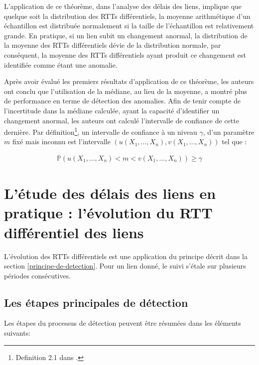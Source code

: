 L'application de ce théorème, dans  l'analyse des délais des liens, implique que quelque soit la distribution des RTTs différentiels, la moyenne arithmétique d'un échantillon  est distribuée normalement si la taille de l'échantillon est relativement grande. En pratique,
si un lien subit un changement anormal, la distribution de la moyenne des RTTs différentiels dévie de la distribution normale, par conséquent, la moyenne des RTTs différentiels ayant produit ce changement est identifiée comme  étant une anomalie.

Après avoir évalué les premiers résultats d'application de ce théorème, les auteurs ont conclu que l'utilisation de la médiane,  au lieu de la moyenne, a montré plus de performance en terme de détection des anomalies.
Afin de tenir compte de l'incertitude dans la médiane calculée, ayant la capacité d'identifier un changement anormal, les auteurs ont  calculé  l'intervalle de confiance de cette dernière.
Par définition\footnote{Definition 2.1 dans \cite{leboudec2010performance}.},  un intervalle de confiance à un niveau $\gamma$,  d'un paramètre $m$ fixé mais inconnu est l'intervalle  $(u(X_1,...,X_n),v(X_1,...,X_n)) $ tel que  :

\begin{align}
\mathbb{P}(u(X_1,...,X_n)< m< v(X_1,...,X_n)) \geq \gamma
\end{align}

\section{L'étude des délais des liens en pratique : l'évolution du RTT différentiel des liens}

L'évolution des RTTs différentiels est une  application du principe décrit dans la section  \ref{principe-de-detection}. Pour un lien donné, le suivi s'étale sur plusieurs  périodes consécutives.  

\subsection{Les étapes principales de détection} \label{steps:detection}
Les étapes du processus de détection peuvent être résumées dans les éléments suivants:

